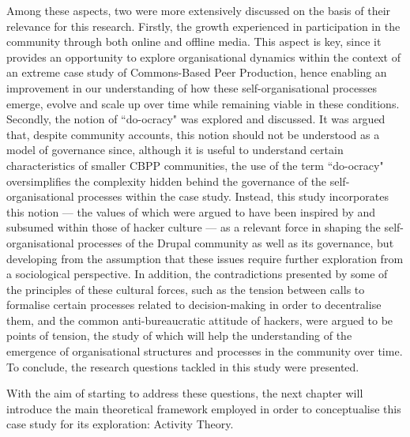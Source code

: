 Among these aspects, two were more extensively discussed on the basis of their relevance for this research. Firstly, the growth experienced in participation in the community through both online and offline media. This aspect is key, since it provides an opportunity to explore organisational dynamics within the context of an extreme case study of Commons-Based Peer Production, hence enabling an improvement in our understanding of how these self-organisational processes emerge, evolve and scale up over time while remaining viable in these conditions. Secondly, the notion of ``do-ocracy" was explored and discussed. It was argued that, despite community accounts, this notion should not be understood as a model of governance since, although it is useful to understand certain characteristics of smaller CBPP communities, the use of the term ``do-ocracy" oversimplifies the complexity hidden behind the governance of the self-organisational processes within the case study. Instead, this study incorporates this notion --- the values  of which were argued to have been inspired by and subsumed within those of hacker culture --- as a relevant force in shaping the self-organisational processes of the Drupal community as well as its governance, but developing from the assumption that these issues require further exploration from a sociological perspective. In addition, the contradictions presented by some of the principles of these cultural forces, such as the tension between calls to formalise certain processes related to decision-making in order to decentralise them, and the common anti-bureaucratic attitude of hackers, were argued to be points of tension, the study of which will help the understanding of the emergence of organisational structures and processes in the community over time. To conclude, the research questions tackled in this study were presented.

With the aim of starting to address these questions, the next chapter will introduce the main theoretical framework employed in order to conceptualise this case study for its exploration: Activity Theory.
